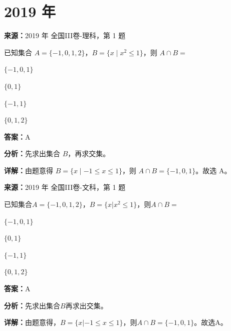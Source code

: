 \section*{2019 年}

\begin{question}[points=5]
\textbf{来源：}2019 年 全国III卷-理科，第 1 题\par
已知集合 $A = \{-1, 0, 1, 2\}$，$B = \{x \mid x^2 \le 1\}$，则 $A \cap B =$
\begin{choices}
  \item $\{-1,0,1\}$
  \item $\{0,1\}$
  \item $\{-1,1\}$
  \item $\{0,1,2\}$
\end{choices}
\begin{solution}
\textbf{答案：}A

\textbf{分析：}先求出集合 $B$，再求交集。

\textbf{详解：}由题意得 $B = \{x \mid -1 \le x \le 1\}$，则 $A \cap B = \{-1,0,1\}$。故选 A。
\end{solution}
\end{question}

\begin{question}[points=5]
\textbf{来源：}2019 年 全国III卷-文科，第 1 题\par
已知集合$A=\{-1,0,1,2\}$，$B=\{x|x^2\le 1\}$，则$A\cap B=$
\begin{choices}
  \item $\{-1,0,1\}$
  \item $\{0,1\}$
  \item $\{-1,1\}$
  \item $\{0,1,2\}$
\end{choices}
\begin{solution}
\textbf{答案：}A

\textbf{分析：}先求出集合$B$再求出交集。

\textbf{详解：}由题意得，$B=\{x|-1\le x\le 1\}$，则$A\cap B=\{-1,0,1\}$。故选A。
\end{solution}
\end{question}

